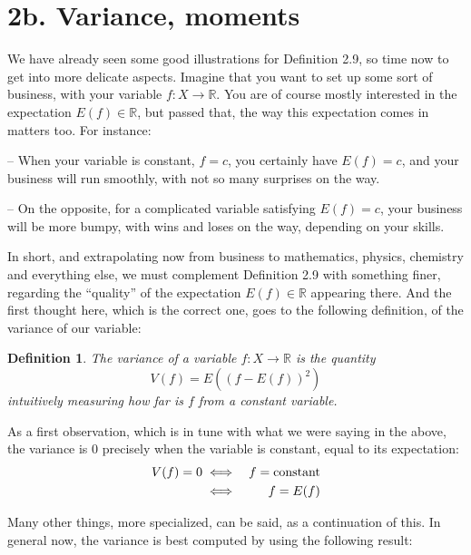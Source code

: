 \documentclass[12pt]{amsbook}
\newtheorem{definition}[theorem]{Definition}
\begin{document}
\section*{2b. Variance, moments}

We have already seen some good illustrations for Definition 2.9, so time now to get into more delicate aspects. Imagine that you want to set up some sort of business, with your variable $f:X\to\mathbb R$. You are of course mostly interested in the expectation $E(f)\in\mathbb R$, but passed that, the way this expectation comes in matters too. For instance:

\bigskip

-- When your variable is constant, $f=c$, you certainly have $E(f)=c$, and your business will run smoothly, with not so many surprises on the way.

\bigskip

-- On the opposite, for a complicated variable satisfying $E(f)=c$, your business will be more bumpy, with wins and loses on the way, depending on your skills.

\bigskip

In short, and extrapolating now from business to mathematics, physics, chemistry and everything else, we must complement Definition 2.9 with something finer, regarding the ``quality'' of the expectation $E(f)\in\mathbb R$ appearing there. And the first thought here, which is the correct one, goes to the following definition, of the variance of our variable:


\begin{definition}
The variance of a variable $f:X\to\mathbb R$ is the quantity
$$V(f)=E\left((f-E(f))^2\right)$$
intuitively measuring how far is $f$ from a constant variable.
\end{definition}

As a first observation, which is in tune with what we were saying in the above, the variance is 0 precisely when the variable is constant, equal to its expectation:
\begin{eqnarray*}
V(f)=0
&\iff&f={\rm constant}\\
&\iff&f=E(f)
\end{eqnarray*}

Many other things, more specialized, can be said, as a continuation of this. In general now, the variance is best computed by using the following result:

\end{document}
